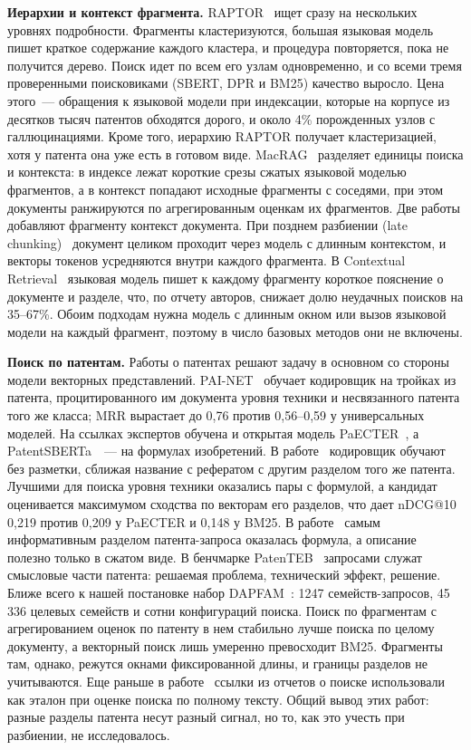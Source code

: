 \documentclass{article}
\begin{document}
\textbf{Иерархии и контекст фрагмента.}
RAPTOR~\citep{sarthi2024raptor} ищет сразу на нескольких уровнях подробности. Фрагменты кластеризуются, большая языковая модель пишет краткое содержание каждого кластера, и процедура повторяется, пока не получится дерево. Поиск идет по всем его узлам одновременно, и со всеми тремя проверенными поисковиками (SBERT, DPR и BM25) качество выросло. Цена этого~--- обращения к языковой модели при индексации, которые на корпусе из десятков тысяч патентов обходятся дорого, и около 4\% порожденных узлов с галлюцинациями. Кроме того, иерархию RAPTOR получает кластеризацией, хотя у патента она уже есть в готовом виде. MacRAG~\citep{lim2025macrag} разделяет единицы поиска и контекста: в индексе лежат короткие срезы сжатых языковой моделью фрагментов, а в контекст попадают исходные фрагменты с соседями, при этом документы ранжируются по агрегированным оценкам их фрагментов. Две работы добавляют фрагменту контекст документа. При позднем разбиении (late chunking)~\citep{gunther2024late} документ целиком проходит через модель с длинным контекстом, и векторы токенов усредняются внутри каждого фрагмента. В Contextual Retrieval~\citep{anthropic2024contextual} языковая модель пишет к каждому фрагменту короткое пояснение о документе и разделе, что, по отчету авторов, снижает долю неудачных поисков на 35--67\%. Обоим подходам нужна модель с длинным окном или вызов языковой модели на каждый фрагмент, поэтому в число базовых методов они не включены.

\textbf{Поиск по патентам.}
Работы о патентах решают задачу в основном со стороны модели векторных представлений. PAI-NET~\citep{lee2025painet} обучает кодировщик на тройках из патента, процитированного им документа уровня техники и несвязанного патента того же класса; MRR вырастает до 0,76 против 0,56--0,59 у универсальных моделей. На ссылках экспертов обучена и открытая модель PaECTER~\citep{ghosh2024paecter}, а PatentSBERTa~\citep{bekamiri2021patentsberta}~--- на формулах изобретений. В работе~\citep{zuo2026patent} кодировщик обучают без разметки, сближая название с рефератом с другим разделом того же патента. Лучшими для поиска уровня техники оказались пары с формулой, а кандидат оценивается максимумом сходства по векторам его разделов, что дает nDCG@10 0,219 против 0,209 у PaECTER и 0,148 у BM25. В работе~\citep{kamateri2025summarization} самым информативным разделом патента-запроса оказалась формула, а описание полезно только в сжатом виде. В бенчмарке PatenTEB~\citep{ayaou2025patenteb} запросами служат смысловые части патента: решаемая проблема, технический эффект, решение. Ближе всего к нашей постановке набор DAPFAM~\citep{ayaou2025dapfam}: 1247 семейств-запросов, 45\,336 целевых семейств и сотни конфигураций поиска. Поиск по фрагментам с агрегированием оценок по патенту в нем стабильно лучше поиска по целому документу, а векторный поиск лишь умеренно превосходит BM25. Фрагменты там, однако, режутся окнами фиксированной длины, и границы разделов не учитываются. Еще раньше в работе~\citep{helmers2019prior} ссылки из отчетов о поиске использовали как эталон при оценке поиска по полному тексту. Общий вывод этих работ: разные разделы патента несут разный сигнал, но то, как это учесть при разбиении, не исследовалось.
\end{document}
